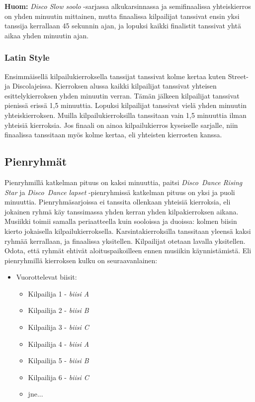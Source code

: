 \documentclass[12pt, a4paper, oneside]{article}
\begin{document}
\textbf{Huom:} \textit{Disco Slow soolo} -sarjassa alkukarsinnassa ja semifinaalissa yhteiskierros on yhden minuutin mittainen, mutta finaalissa kilpailijat tanssivat ensin yksi tanssija kerrallaan 45 sekunnin ajan, ja lopuksi kaikki finalistit tanssivat yhtä aikaa yhden minuutin ajan.

\subsubsection{Latin Style}

Ensimmäisellä kilpailukierroksella tanssijat tanssivat kolme kertaa kuten Street- ja Discolajeissa. Kierroksen alussa kaikki kilpailijat tanssivat yhteisen esittelykierroksen yhden minuutin verran. Tämän jälkeen kilpailijat tanssivat pienissä erissä 1,5 minuuttia. Lopuksi kilpailijat tanssivat vielä yhden minuutin yhteiskierroksen. Muilla kilpailukierroksilla tanssitaan vain 1,5 minuuttia ilman yhteisiä kierroksia. Jos finaali on ainoa kilpailukierros kyseiselle sarjalle, niin finaalissa tanssitaan myös kolme kertaa, eli yhteisten kierrosten kanssa.

\subsection{Pienryhmät}

Pienryhmillä katkelman pituus on kaksi minuuttia, paitsi \textit{Disco~Dance Rising Star} ja \textit{Disco~Dance lapset} -pienryhmissä katkelman pituus on yksi ja puoli minuuttia. Pienryhmäsarjoissa ei tanssita ollenkaan yhteisiä kierroksia, eli jokainen ryhmä käy tanssimassa yhden kerran yhden kilpakierroksen aikana. Musiikki toimii samalla periaatteella kuin sooloissa ja duoissa: kolmen biisin kierto jokaisella kilpailukierroksella. Karsintakierroksilla tanssitaan yleensä kaksi ryhmää kerrallaan, ja finaalissa yksitellen. Kilpailijat otetaan lavalla yksitellen. Odota, että ryhmät ehtivät aloituspaikoilleen ennen musiikin käynnistämistä. Eli pienryhmillä kierroksen kulku on seuraavanlainen:

\begin{itemize}[nosep]
    \item Vuorottelevat biisit:
          \begin{itemize}
              \item Kilpailija 1 - \textit{biisi A}
              \item Kilpailija 2 - \textit{biisi B}
              \item Kilpailija 3 - \textit{biisi C}
              \item Kilpailija 4 - \textit{biisi A}
              \item Kilpailija 5 - \textit{biisi B}
              \item Kilpailija 6 - \textit{biisi C}
              \item jne...
          \end{itemize}
\end{itemize}
\end{document}
